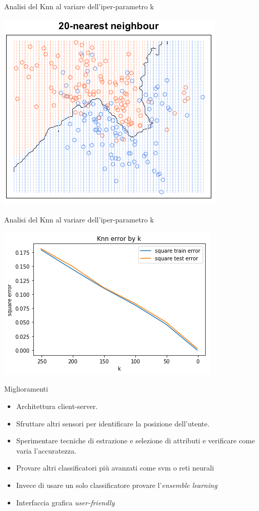 \documentclass[11pt]{beamer}
\begin{document}
	\begin{frame}{Analisi del Knn al variare dell'iper-parametro k}
		\begin{center}
		\includegraphics[width=0.8\linewidth]{img/20nearestneigh}
		\end{center}
	\end{frame}
	\begin{frame}{Analisi del Knn al variare dell'iper-parametro k}
		\begin{center}
			\includegraphics[width=1\linewidth]{img/biasvariance_knn}
		\end{center}
	\end{frame}
	\begin{frame}{Miglioramenti}
		\begin{itemize}
			\item Architettura client-server.
			\item Sfruttare altri sensori per identificare la posizione dell'utente.
			\item Sperimentare tecniche di estrazione e selezione di attributi e verificare come varia l'accuratezza.
			\item Provare altri classificatori pi\`u avanzati come svm o reti neurali
			\item Invece di usare un solo classificatore provare l'\textit{ensemble learning}
			\item Interfaccia grafica \textit{user-friendly}
		\end{itemize}
	\end{frame}
\end{document}
